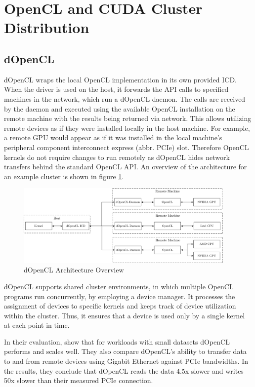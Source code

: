 \section{OpenCL and CUDA Cluster Distribution}
\label{cluster_distribution}
\subsection*{dOpenCL}

dOpenCL wraps the local OpenCL implementation in its own provided ICD. When the driver is used on the host, it forwards the API calls to specified machines in the network, which run a dOpenCL daemon\cite{dopencl}. The calls are received by the daemon and executed using the available OpenCL installation on the remote machine with the results being returned via network. This allows utilizing remote devices as if they were installed locally in the host machine. For example, a remote GPU would appear as if it was installed in the local machine's peripheral component interconnect express (abbr. PCIe) slot. Therefore OpenCL kernels do not require changes to run remotely as dOpenCL hides network transfers behind the standard OpenCL API. An overview of the architecture for an example cluster is shown in figure \ref{img:dopencl_arch}.

\begin{figure}[H]

	\includegraphics[width=0.95\textwidth]{drawings/dopencl_arch.pdf}
	\centering
	\caption{dOpenCL Architecture Overview}
	\label{img:dopencl_arch}
\end{figure}

dOpenCL supports shared cluster environments, in which multiple OpenCL programs run concurrently, by employing a device manager. It processes the assignment of devices to specific kernels and keeps track of device utilization within the cluster. Thus, it ensures that a device is used only by a single kernel at each point in time.

In their evaluation, \citeauthor{dopencl} show that for workloads with small datasets dOpenCL performs and scales well. They also compare dOpenCL's ability to transfer data to and from remote devices using Gigabit Ethernet against PCIe bandwidths. In the results, they conclude that dOpenCL reads the data 4.5x slower and writes 50x slower than their measured PCIe connection.


